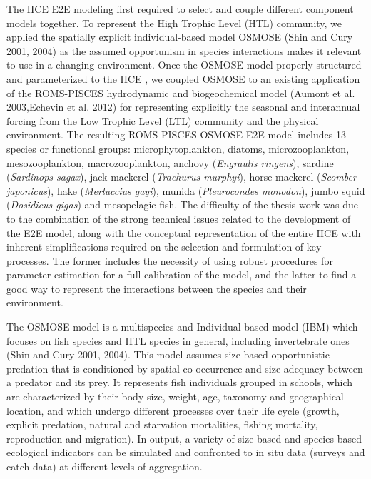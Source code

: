 The HCE E2E modeling first required to select and couple different component models together. To represent the High Trophic Level (HTL) community, we applied the spatially explicit individual-based model OSMOSE (Shin and Cury 2001, 2004) as the assumed opportunism in species interactions makes it relevant to use in a changing environment. Once the OSMOSE model properly structured and parameterized to the HCE , we coupled OSMOSE to an existing application of the ROMS-PISCES hydrodynamic and biogeochemical model (Aumont et al. 2003,Echevin et al. 2012) for representing explicitly the seasonal and interannual forcing from the Low Trophic Level (LTL) community and the physical environment. The resulting ROMS-PISCES-OSMOSE E2E model includes 13 species or functional groups: microphytoplankton, diatoms, microzooplankton, mesozooplankton, macrozooplankton, anchovy (\emph{Engraulis ringens}), sardine (\emph{Sardinops sagax}), jack mackerel (\emph{Trachurus murphyi}), horse mackerel (\emph{Scomber japonicus}), hake (\emph{Merluccius gayi}), munida (\emph{Pleurocondes monodon}), jumbo squid (\emph{Dosidicus gigas}) and mesopelagic fish. The difficulty of the thesis work was due to the combination of the strong technical issues related to the development of the E2E model, along with the conceptual representation of the entire HCE with inherent simplifications required on the selection and formulation of key processes. The former includes the necessity of using robust procedures for parameter estimation for a full calibration of the model, and the latter to find a good way to represent the interactions between the species and their environment. 

The OSMOSE model is a multispecies and Individual-based model (IBM) which focuses on fish species and HTL species in general, including invertebrate ones (Shin and Cury 2001, 2004). This model assumes size-based opportunistic predation that is conditioned by spatial co-occurrence and size adequacy between a predator and its prey. It represents fish individuals grouped in schools, which are characterized by their body size, weight, age, taxonomy and geographical location, and which undergo different processes over their life cycle (growth, explicit predation, natural and starvation mortalities, fishing mortality, reproduction and migration). In output, a variety of size-based and species-based ecological indicators can be simulated and confronted to in situ data (surveys and catch data) at different levels of aggregation. 

